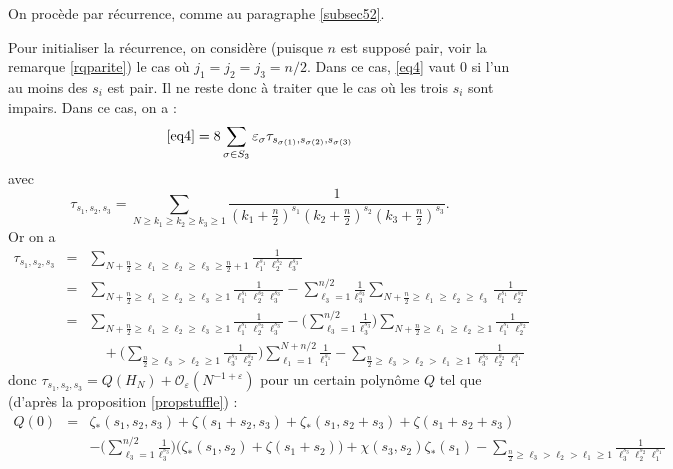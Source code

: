 \documentclass[12pt,francais, reqno]{smfart}
\numberwithin{equation}{section}
\newcommand{\gdo}{\mathcal{O}}
\newcommand{\strois}{\mathfrak{S}_3}
\newcommand{\eps}{\varepsilon}
\newcommand{\gdoeps}{\gdo_\eps (N^{-1+\eps})}
\newcommand{\zetaetoile}{\zeta _*}
\begin{document}
On proc\`ede par r\'ecurrence, comme au paragraphe \ref{subsec52}.

Pour initialiser la r\'ecurrence, on consid\`ere (puisque $n$ est suppos\'e pair, voir la remarque \ref{rqparite}) le cas o\`u $j_1 = j_2 = j_3 = n/2$. Dans ce cas, \eqref{eq4} vaut 0 si l'un au moins des $s_i$ est pair. Il ne reste donc \`a traiter que le cas o\`u les trois $s_i$ sont impairs. Dans ce cas, on a :
$$\eqref{eq4} = 8 \sum_{\sigma \in \strois} \eps_\sigma \tau_{s_{\sigma(1)},s_{\sigma(2)}, s_{\sigma(3)}}$$
avec
$$\tau_{s_1, s_2,s_3} = \sum_{N \geq k_1 \geq k_2 \geq k_3 \geq 1} \frac{1}{(k_1 + \frac{n}{2})^{s_1}  (k_2 + \frac{n}{2})^{s_2}  (k_3 + \frac{n}{2})^{s_3}   }.$$
Or on a  
\begin{eqnarray*}
\tau_{s_1, s_2, s_3} 
&=&  \sum_{N + \frac{n}{2} \geq \ell_1 \geq \ell_2  \geq \ell_3 \geq  \frac{n}{2} + 1} \frac{1}{\ell_1^{s_1} \ell_2^{s_2}  \ell_3^{s_3}   }\\
&=&  \sum_{N + \frac{n}{2} \geq \ell_1 \geq \ell_2  \geq \ell_3 \geq   1} \frac{1}{\ell_1^{s_1} \ell_2^{s_2}  \ell_3^{s_3}   } -   \sum_{\ell_3 = 1} ^{n/2}  \frac{1}{\ell_3^{s_3}}  
 \sum_{N + \frac{n}{2} \geq \ell_1 \geq \ell_2 \geq  \ell_3} \frac{1}{\ell_1^{s_1} \ell_2^{s_2}}  \\
&=&  \sum_{N + \frac{n}{2} \geq \ell_1 \geq \ell_2  \geq \ell_3 \geq   1} \frac{1}{\ell_1^{s_1} \ell_2^{s_2}  \ell_3^{s_3}   } -  \Big(  \sum_{\ell_3 = 1} ^{n/2}  \frac{1}{\ell_3^{s_3}}   \Big) 
 \sum_{N + \frac{n}{2} \geq \ell_1 \geq \ell_2 \geq  1} \frac{1}{\ell_1^{s_1} \ell_2^{s_2}} \\
&& \quad +  \Big( \sum_{\frac{n}{2} \geq \ell_3 > \ell_2 \geq  1} \frac{1}{\ell_3^{s_3} \ell_2^{s_2}} \Big)
 \sum_{\ell_1 = 1} ^{N + n/2}  \frac{1}{\ell_1^{s_1}}
 -   \sum_{ \frac{n}{2} \geq  \ell_3 >  \ell_2 >  \ell_1 \geq  1} \frac{1}{\ell_3^{s_3} \ell_2^{s_2}  \ell_1^{s_1}   }
\end{eqnarray*} 
donc $ \tau_{s_1, s_2, s_3}  = Q(H_N) + \gdoeps$ pour un certain polyn\^ome $Q$ tel que (d'apr\`es la proposition \ref{propstuffle}) : 
\begin{eqnarray*}
Q(0) &=& \zetaetoile(s_1,s_2,s_3) + \zeta(s_1+s_2, s_3) + \zetaetoile(s_1, s_2+s_3) + \zeta(s_1+s_2+s_3)\\
&& - \Big( \sum_{\ell_3 = 1} ^{n/2} \frac{1}{\ell_3^{s_3}} \Big) 
\Big( \zetaetoile (s_1, s_2) +  \zeta (s_1+s_2) \Big)  + \chi(s_3, s_2) \zetaetoile(s_1) 
-   \sum_{ \frac{n}{2} \geq  \ell_3 >  \ell_2 >  \ell_1 \geq  1} \frac{1}{\ell_3^{s_3} \ell_2^{s_2}  \ell_1^{s_1} } 
\end{eqnarray*}
\end{document}
